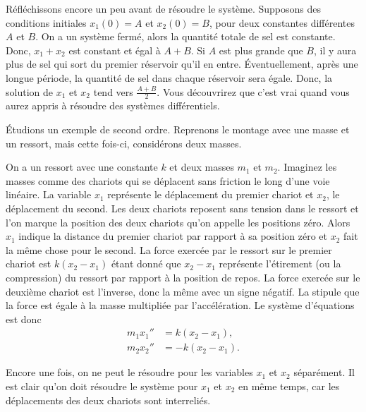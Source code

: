 \begin{example}
Réfléchissons encore un peu avant de résoudre le système. Supposons des conditions initiales $x_1(0) = A$ et $x_2(0) = B$, pour deux constantes différentes $A$ et $B$.  On a un système fermé, alors la quantité totale de sel est constante. Donc, $x_1+x_2$ est constant et égal à $A+B$.
Si $A$ est plus grande que $B$, il y aura plus de sel qui sort du premier réservoir qu’il en entre. Éventuellement, après une longue période, la quantité de sel dans chaque réservoir sera égale. Donc, la solution de $x_1$ et $x_2$ tend vers $\frac{A+B}{2}$.  Vous découvrirez que c'est vrai quand vous aurez appris à résoudre des systèmes différentiels.
\end{example}

\begin{example} \label{sintro:carts-example}
Étudions un exemple de second ordre. Reprenons le montage avec une masse et un ressort, mais cette fois-ci, considérons deux masses.

\begin{mywrapfigsimp}{2.0in}{2.3in}
\noindent
{}
\end{mywrapfigsimp}
On a un ressort avec une constante $k$ et deux masses $m_1$
et $m_2$. Imaginez les masses comme des chariots qui se déplacent sans friction le long d'une voie linéaire. La variable $x_1$ représente le déplacement du premier chariot et $x_2$, le déplacement du second. Les deux chariots reposent sans tension dans le ressort et l'on marque la position des deux chariots qu'on appelle les positions zéro. Alors $x_1$ indique la distance du premier chariot par rapport à sa position zéro et $x_2$ fait la même chose pour le second. La force exercée par le ressort sur le premier chariot est
$k(x_2-x_1)$ étant donné que 
$x_2-x_1$ représente l’étirement (ou la compression) du ressort par rapport à la position de repos. La force exercée sur le deuxième chariot est l'inverse, donc la même avec un signe négatif. La 
 stipule que la force est égale à la masse multipliée par l’accélération. Le système d’équations est donc
\begin{align*}
m_1 x_1'' & = k(x_2-x_1) , \\
m_2 x_2'' & = - k(x_2-x_1) .
\end{align*}

Encore une fois, on ne peut le résoudre pour les variables $x_1$ et $x_2$ séparément. Il est clair qu'on doit résoudre le système pour $x_1$ et $x_2$ en même temps, car les déplacements des deux chariots sont interreliés.
\end{example}

